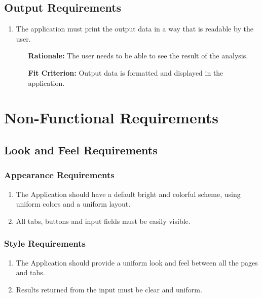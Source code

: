 \documentclass[english]{article}
\begin{document}
\subsection{Output Requirements}
\begin{enumerate}[\bf{FOR}1.]
    \item The application must print the output data in a way that is readable by the user.
	\begin{enumerate}[leftmargin=1cm]
        \item [{\bf Rationale:}] The user needs to be able to see the result of the analysis.
        \item [{\bf Fit Criterion:}] Output data is formatted and displayed in the application.
	\end{enumerate}
	

\end{enumerate}

\section{Non-Functional Requirements}
\label{sec:non-functional_requirements}
\subsection{Look and Feel Requirements}
\label{sub:look_and_feel_requirements}

\subsubsection{Appearance Requirements}
\label{ssub:appearance_requirements}
\begin{enumerate}[{AR}1. ]

\item The Application should have a default bright and colorful scheme, using uniform colors and a uniform layout.

\item All tabs, buttons and input fields must be easily visible.


\end{enumerate}

\subsubsection{Style Requirements}
\label{ssub:style_requirements}
\begin{enumerate}[{SR}1. ]
\item The Application should provide a uniform look and feel between all the pages and tabs.

\item Results returned from the input must be clear and uniform.
\end{enumerate}
\end{document}
